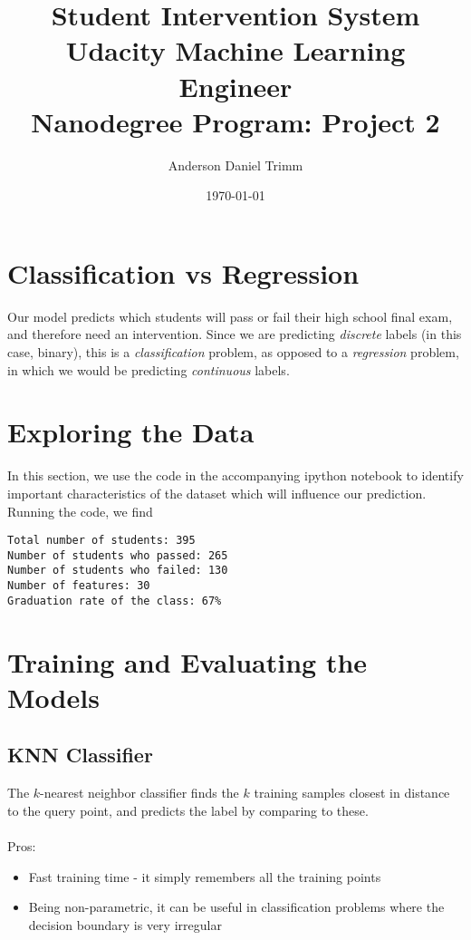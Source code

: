 \documentclass[12 pt]{article}
\numberwithin{equation}{section}
\begin{document}
\title{Student Intervention System \\ \footnotesize{Udacity Machine Learning Engineer \\ Nanodegree Program: Project 2}}
\author{Anderson Daniel Trimm}
\date{\today}
\maketitle

\section{Classification vs Regression}
Our model predicts which students will pass or fail their high school final exam, and therefore need an intervention. Since we are predicting \emph{discrete} labels (in this case, binary), this is a \emph{classification} problem, as opposed to a \emph{regression} problem, in which we would be predicting \emph{continuous} labels.
\section{Exploring the Data}
In this section, we use the code in the accompanying ipython notebook to identify important characteristics of the dataset which will influence our prediction. Running the code, we find

\begin{verbatim}	
Total number of students: 395
Number of students who passed: 265
Number of students who failed: 130
Number of features: 30
Graduation rate of the class: 67%
\end{verbatim}

\section{Training and Evaluating the Models}
\subsection{KNN Classifier}
The $k$-nearest neighbor classifier finds the $k$ training samples closest in distance to the query point, and predicts the label by comparing to these. \\
\\
Pros:
\begin{itemize}
	\item Fast training time - it simply remembers all the training points
	\item Being non-parametric, it can be useful in classification problems where the decision boundary is very irregular
\end{itemize}
\end{document}
